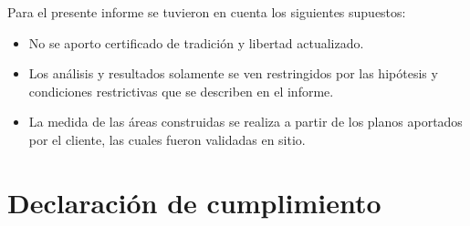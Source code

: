\documentclass[12pt,a4paper,twoside]{article}
\begin{document}
{Para el presente informe se tuvieron en cuenta los siguientes supuestos:

\begin{itemize}
	
    \item No se aporto certificado de tradición y libertad actualizado.
	\item Los análisis y resultados solamente se ven restringidos por las hipótesis y condiciones restrictivas que se describen en el informe.
	\item La medida de las áreas construidas se realiza a partir de los planos aportados por el cliente, las cuales fueron validadas en sitio.
	
\end{itemize}

\section{Declaración de cumplimiento}

}
\end{document}
